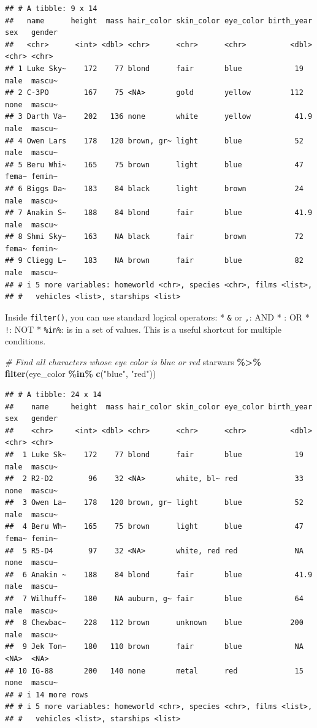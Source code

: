 \documentclass[
  11pt,
]{article}
\newenvironment{Shaded}{\begin{snugshade}}{\end{snugshade}}
\newcommand{\CommentTok}[1]{\textcolor[rgb]{0.56,0.35,0.01}{\textit{#1}}}
\newcommand{\FunctionTok}[1]{\textcolor[rgb]{0.13,0.29,0.53}{\textbf{#1}}}
\newcommand{\NormalTok}[1]{#1}
\newcommand{\SpecialCharTok}[1]{\textcolor[rgb]{0.81,0.36,0.00}{\textbf{#1}}}
\newcommand{\StringTok}[1]{\textcolor[rgb]{0.31,0.60,0.02}{#1}}
\begin{document}
\begin{verbatim}
## # A tibble: 9 x 14
##   name      height  mass hair_color skin_color eye_color birth_year sex   gender
##   <chr>      <int> <dbl> <chr>      <chr>      <chr>          <dbl> <chr> <chr> 
## 1 Luke Sky~    172    77 blond      fair       blue            19   male  mascu~
## 2 C-3PO        167    75 <NA>       gold       yellow         112   none  mascu~
## 3 Darth Va~    202   136 none       white      yellow          41.9 male  mascu~
## 4 Owen Lars    178   120 brown, gr~ light      blue            52   male  mascu~
## 5 Beru Whi~    165    75 brown      light      blue            47   fema~ femin~
## 6 Biggs Da~    183    84 black      light      brown           24   male  mascu~
## 7 Anakin S~    188    84 blond      fair       blue            41.9 male  mascu~
## 8 Shmi Sky~    163    NA black      fair       brown           72   fema~ femin~
## 9 Cliegg L~    183    NA brown      fair       blue            82   male  mascu~
## # i 5 more variables: homeworld <chr>, species <chr>, films <list>,
## #   vehicles <list>, starships <list>
\end{verbatim}

Inside \texttt{filter()}, you can use standard logical operators: *
\texttt{\&} or \texttt{,}: AND * \texttt{\textbar{}}: OR * \texttt{!}:
NOT * \texttt{\%in\%}: is in a set of values. This is a useful shortcut
for multiple \texttt{\textbar{}} conditions.

\begin{Shaded}
\begin{Highlighting}[]
\CommentTok{\# Find all characters whose eye color is blue or red}
\NormalTok{starwars }\SpecialCharTok{\%\textgreater{}\%} 
  \FunctionTok{filter}\NormalTok{(eye\_color }\SpecialCharTok{\%in\%} \FunctionTok{c}\NormalTok{(}\StringTok{"blue"}\NormalTok{, }\StringTok{"red"}\NormalTok{))}
\end{Highlighting}
\end{Shaded}

\begin{verbatim}
## # A tibble: 24 x 14
##    name     height  mass hair_color skin_color eye_color birth_year sex   gender
##    <chr>     <int> <dbl> <chr>      <chr>      <chr>          <dbl> <chr> <chr> 
##  1 Luke Sk~    172    77 blond      fair       blue            19   male  mascu~
##  2 R2-D2        96    32 <NA>       white, bl~ red             33   none  mascu~
##  3 Owen La~    178   120 brown, gr~ light      blue            52   male  mascu~
##  4 Beru Wh~    165    75 brown      light      blue            47   fema~ femin~
##  5 R5-D4        97    32 <NA>       white, red red             NA   none  mascu~
##  6 Anakin ~    188    84 blond      fair       blue            41.9 male  mascu~
##  7 Wilhuff~    180    NA auburn, g~ fair       blue            64   male  mascu~
##  8 Chewbac~    228   112 brown      unknown    blue           200   male  mascu~
##  9 Jek Ton~    180   110 brown      fair       blue            NA   <NA>  <NA>  
## 10 IG-88       200   140 none       metal      red             15   none  mascu~
## # i 14 more rows
## # i 5 more variables: homeworld <chr>, species <chr>, films <list>,
## #   vehicles <list>, starships <list>
\end{verbatim}
\end{document}
